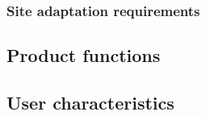 \documentclass{scrreprt}
\begin{document}
\subsubsection{Site adaptation requirements}


\subsection{Product functions}




\subsection{User characteristics}
%
\end{document}

